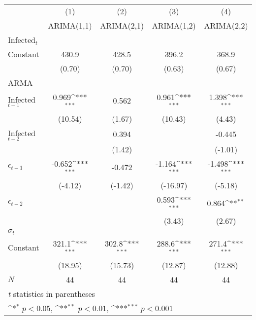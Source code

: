 \documentclass[12pt]{article}
\begin{document}
\centering
{
\def\sym#1{\ifmmode^{#1}\else\(^{#1}\)\fi}
\begin{tabular}{l*{4}{c}}
\hline\hline
            &\multicolumn{1}{c}{(1)}&\multicolumn{1}{c}{(2)}&\multicolumn{1}{c}{(3)}&\multicolumn{1}{c}{(4)}\\
            &\multicolumn{1}{c}{ARIMA(1,1)}&\multicolumn{1}{c}{ARIMA(2,1)}&\multicolumn{1}{c}{ARIMA(1,2)}&\multicolumn{1}{c}{ARIMA(2,2)}\\
\hline
Infected$_t$    &                     &                     &                     &                     \\
Constant      &       430.9         &       428.5         &       396.2         &       368.9         \\
            &      (0.70)         &      (0.70)         &      (0.63)         &      (0.67)         \\
\hline
ARMA        &                     &                     &                     &                     \\
Infected$_{t-1}$       &       0.969\sym{***}&       0.562         &       0.961\sym{***}&       1.398\sym{***}\\
            &     (10.54)         &      (1.67)         &     (10.43)         &      (4.43)         \\
Infected$_{t-2}$       &                     &       0.394         &                     &      -0.445         \\
            &                     &      (1.42)         &                     &     (-1.01)         \\
$\epsilon_{t-1}$        &      -0.652\sym{***}&      -0.472         &      -1.164\sym{***}&      -1.498\sym{***}\\
            &     (-4.12)         &     (-1.42)         &    (-16.97)         &     (-5.18)         \\
$\epsilon_{t-2}$       &                     &                     &       0.593\sym{***}&       0.864\sym{**} \\
            &                     &                     &      (3.43)         &      (2.67)         \\
\hline
$\sigma_{t}$      &                     &                     &                     &                     \\
Constant      &       321.1\sym{***}&       302.8\sym{***}&       288.6\sym{***}&       271.4\sym{***}\\
            &     (18.95)         &     (15.73)         &     (12.87)         &     (12.88)         \\
\hline
\(N\)       &          44        &          44         &          44         &          44         \\
\hline\hline
\multicolumn{5}{l}{\footnotesize \textit{t} statistics in parentheses}\\
\multicolumn{5}{l}{\footnotesize \sym{*} \(p<0.05\), \sym{**} \(p<0.01\), \sym{***} \(p<0.001\)}\\
\end{tabular}
}
\end{document}
